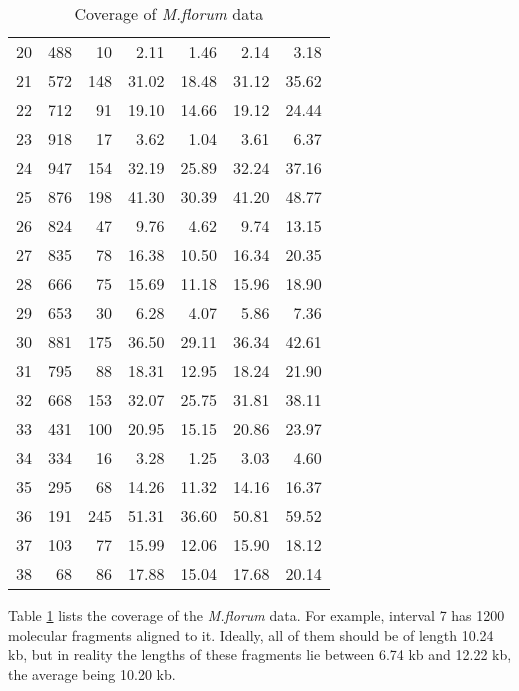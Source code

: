 \begin{table}[H]
\begin{tabular}{lrrr|rrr}
   20 & 488 & 10 & 2.11 & 1.46 & 2.14 & 3.18 \\ 
   21 & 572 & 148 & 31.02 & 18.48 & 31.12 & 35.62 \\ 
   22 & 712 & 91 & 19.10 & 14.66 & 19.12 & 24.44 \\ 
   23 & 918 & 17 & 3.62 & 1.04 & 3.61 & 6.37 \\ 
   24 & 947 & 154 & 32.19 & 25.89 & 32.24 & 37.16 \\ 
   25 & 876 & 198 & 41.30 & 30.39 & 41.20 & 48.77 \\ 
   26 & 824 & 47 & 9.76 & 4.62 & 9.74 & 13.15 \\ 
   27 & 835 & 78 & 16.38 & 10.50 & 16.34 & 20.35 \\ 
   28 & 666 & 75 & 15.69 & 11.18 & 15.96 & 18.90 \\ 
   29 & 653 & 30 & 6.28 & 4.07 & 5.86 & 7.36 \\ 
   30 & 881 & 175 & 36.50 & 29.11 & 36.34 & 42.61 \\ 
   31 & 795 & 88 & 18.31 & 12.95 & 18.24 & 21.90 \\ 
   32 & 668 & 153 & 32.07 & 25.75 & 31.81 & 38.11 \\ 
   33 & 431 & 100 & 20.95 & 15.15 & 20.86 & 23.97 \\ 
   34 & 334 & 16 & 3.28 & 1.25 & 3.03 & 4.60 \\ 
   35 & 295 & 68 & 14.26 & 11.32 & 14.16 & 16.37 \\ 
   36 & 191 & 245 & 51.31 & 36.60 & 50.81 & 59.52 \\ 
   37 & 103 & 77 & 15.99 & 12.06 & 15.90 & 18.12 \\ 
   38 &  68 & 86 & 17.88 & 15.04 & 17.68 & 20.14 \\ 
  \hline
  \hline
\end{tabular}
\caption{Coverage of {\emph{M.florum}} data}
\label{tab:mftable}
\end{table}

Table \ref{tab:mftable} lists the coverage of the {\emph{M.florum}} data. For example, interval 7 has 1200 molecular fragments aligned to it. Ideally, all of them should be of length 10.24 kb, but in reality the lengths of these fragments lie between 6.74 kb and 12.22 kb, the average being 10.20 kb. 

